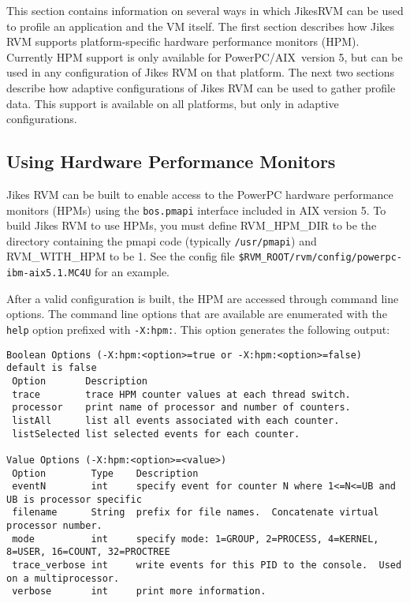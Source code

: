 This section contains information on several ways in which
Jikes\trademark RVM can be used to profile an application and the VM
itself.  The first section describes how Jikes RVM supports
platform-specific hardware performance monitors (HPM). Currently HPM
support is only available for
PowerPC\PowerPCTMFootnote/AIX\AIXTMFootnote\ version 5, but can be
used in any configuration of Jikes RVM on that platform.  The next two
sections describe how adaptive configurations of Jikes RVM can be used
to gather profile data.  This support is available on all platforms,
but only in adaptive configurations.

\AIXPPCJikesTMFooter

\subsection{Using Hardware Performance Monitors}

Jikes RVM can be built to enable access to the PowerPC hardware
performance monitors (HPMs) using the {\tt bos.pmapi} interface 
included in AIX version 5. To build Jikes RVM to use
HPMs, you must define RVM\_HPM\_DIR to be the directory containing
the pmapi code (typically {\tt /usr/pmapi}) and RVM\_WITH\_HPM to be 1.
See the config file {\tt \$RVM\_ROOT/rvm/config/powerpc-ibm-aix5.1.MC4U} for
an example.

After a valid configuration is built, the HPM are accessed through 
command line options. 
The command line options that are available are enumerated with the 
{\tt help} option prefixed with {\tt -X:hpm:}.  This option
generates the following output:
%
\begin{verbatim}
Boolean Options (-X:hpm:<option>=true or -X:hpm:<option>=false) default is false
 Option       Description
 trace        trace HPM counter values at each thread switch.
 processor    print name of processor and number of counters.
 listAll      list all events associated with each counter.
 listSelected list selected events for each counter.

Value Options (-X:hpm:<option>=<value>)
 Option        Type    Description
 eventN        int     specify event for counter N where 1<=N<=UB and UB is processor specific
 filename      String  prefix for file names.  Concatenate virtual processor number.
 mode          int     specify mode: 1=GROUP, 2=PROCESS, 4=KERNEL, 8=USER, 16=COUNT, 32=PROCTREE
 trace_verbose int     write events for this PID to the console.  Used on a multiprocessor.
 verbose       int     print more information.
\end{verbatim}

